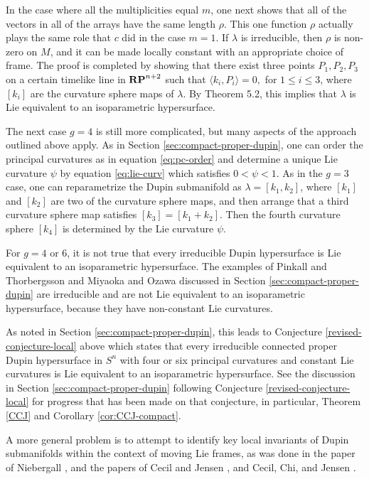 \documentclass[12pt]{article}
\begin{document}
{In the case where all the multiplicities equal $m$,
one next shows that all of the vectors in all of the
arrays have the same length $\rho$.  This one function $\rho$
actually plays the same role that $c$ did in the case $m=1$.
If $\lambda$ is irreducible, then $\rho$ is non-zero on $M$, and
it can be made locally constant with an appropriate choice of frame.
The proof is completed by showing that there exist three points 
$P_1, P_2, P_3$ on a certain timelike line in ${\bf RP}^{n+2}$ such that
$\langle k_i, P_i \rangle = 0,$ for $1\leq i \leq 3$, where $[k_i]$ are the
curvature sphere maps of $\lambda$.  By Theorem 5.2, this implies that
$\lambda$ is Lie equivalent to an isoparametric hypersurface.


The next case $g=4$ is still more complicated,
but many aspects of the approach outlined above apply.  As in Section \ref{sec:compact-proper-dupin},
one can order the principal
curvatures as in equation \eqref{eq:pc-order}
and determine a unique Lie curvature $\psi$ by equation \eqref{eq:lie-curv} which satisfies
$0< \psi < 1$.  As in the
$g=3$ case, one can reparametrize the Dupin submanifold as
$\lambda = [k_1, k_2]$, where $[k_1]$ and $[k_2]$ are two of the
curvature sphere maps,  and then arrange that a third curvature
sphere map satisfies $[k_3] = [k_1+k_2]$.  Then the fourth curvature
sphere $[k_4]$ is determined by the Lie curvature $\psi$.  

For $g=4$ or 6, it is not true that every irreducible Dupin 
hypersurface is Lie equivalent to an isoparametric hypersurface.
The examples of Pinkall and Thorbergsson \cite{PT} and Miyaoka and Ozawa
\cite{MO} discussed in Section \ref{sec:compact-proper-dupin} are irreducible and are not
Lie equivalent to an isoparametric hypersurface, because they have non-constant Lie curvatures.

As noted in Section \ref{sec:compact-proper-dupin}, 
this leads to Conjecture \ref{revised-conjecture-local} above which states that
every irreducible connected proper Dupin hypersurface in $S^n$ with four or six principal curvatures
and constant Lie curvatures is Lie equivalent to an isoparametric hypersurface.
See the discussion in Section \ref{sec:compact-proper-dupin} following 
Conjecture \ref{revised-conjecture-local} for progress that has been made on that conjecture,
in particular, Theorem \ref{CCJ}  and Corollary \ref{cor:CCJ-compact}.

A more general problem is to attempt to identify key local
invariants of Dupin submanifolds within the context of moving
Lie frames, as was done in the paper of
Niebergall \cite{N2}, and the papers of Cecil and Jensen \cite{CJ2},
and Cecil, Chi, and Jensen \cite{CCJ2}.


}
\end{document}
